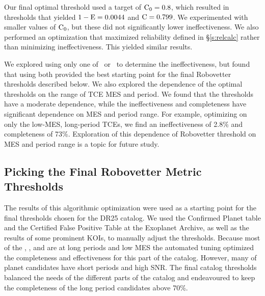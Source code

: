Our final optimal threshold used a target of ${\rm C}_0 = 0.8$, which resulted in thresholds that yielded ${\rm 1-E} = 0.0044$ and ${\rm C} = 0.799$.  We experimented with smaller values of ${\rm C}_0$, but these did not significantly lower ineffectiveness.   We also performed an optimization that maximized reliability defined in \S\ref{s:relcalc} rather than minimizing ineffectiveness. This yielded similar results.

We explored using only one of \scrtce\ or \invtce\ to determine the ineffectiveness, but found that using both provided the best starting point for the final Robovetter thresholds described below.  We also explored the dependence of the optimal thresholds on the range of TCE MES and period.  We found that the thresholds have a moderate dependence, while the ineffectiveness and completeness have significant dependence on MES and period range.  For example, optimizing on only the low-MES, long-period TCEs, we find an ineffectiveness of 2.8\% and completeness of 73\%.  Exploration of this dependence of Robovetter threshold on MES and period range is a topic for future study.


\subsection{Picking the Final Robovetter Metric Thresholds}

The results of this algorithmic optimization were used as a starting point for the final thresholds chosen for the DR25 catalog. We used the Confirmed Planet table and the Certified False Positive Table at the Exoplanet Archive, as well as the results of some prominent KOIs, to manually adjust the thresholds.  Because most of the , , and  are at long periods and low MES the automated tuning optimized the completeness and effectiveness for this part of the catalog. However, many of  planet candidates have short periods and high SNR. The final catalog thresholds balanced the needs of the different parts of the catalog and endeavoured to keep the completeness of the long period candidates above 70\%.

